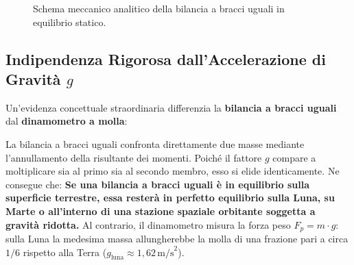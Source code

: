 \documentclass[11pt,a4paper,oneside]{report}
\begin{document}
\begin{figure}[htbp]
\caption{Schema meccanico analitico della bilancia a bracci uguali in equilibrio statico.}
\label{fig:bilancia_bracci_uguali}
\end{figure}

\subsection{Indipendenza Rigorosa dall'Accelerazione di Gravità $g$}
Un'evidenza concettuale straordinaria differenzia la \textbf{bilancia a bracci uguali} dal \textbf{dinamometro a molla}:
\begin{leggefisica}
La bilancia a bracci uguali confronta direttamente due masse mediante l'annullamento della risultante dei momenti. 
Poiché il fattore $g$ compare a moltiplicare sia al primo sia al secondo membro, esso si elide identicamente. 
Ne consegue che:
\textbf{Se una bilancia a bracci uguali è in equilibrio sulla superficie terrestre, essa resterà in perfetto equilibrio sulla Luna, su Marte o all'interno di una stazione spaziale orbitante soggetta a gravità ridotta.}
Al contrario, il dinamometro misura la forza peso $F_p = m \cdot g$: sulla Luna la medesima massa allungherebbe la molla di una frazione pari a circa $1/6$ rispetto alla Terra ($g_{\text{luna}} \approx 1{,}62\,\text{m/s}^2$).
\end{leggefisica}
\end{document}
